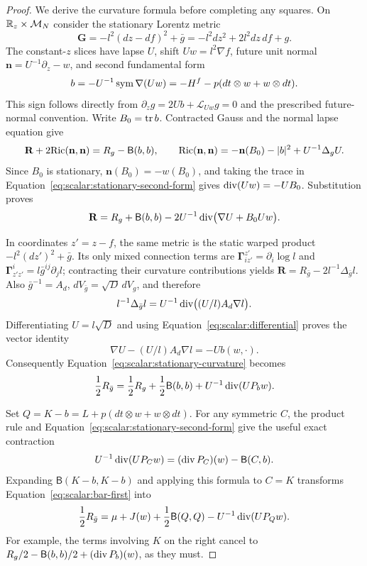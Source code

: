 \begin{proof}
We derive the curvature formula before completing any squares.  On
$\mathbb R_z\times\mathcal M_N$ consider the stationary Lorentz metric
\[
 \mathbf G=-l^2(dz-df)^2+\bar g
          =-l^2dz^2+2l^2dz\,df+g.
\]
The constant-$z$ slices have lapse $U$, shift $Uw=l^2\nabla f$,
future unit normal $\mathbf n=U^{-1}\partial_z-w$, and second
fundamental form
\begin{equation}
 b=-U^{-1}\operatorname{sym}\nabla(Uw)
   =-H^f-p(dt\otimes w+w\otimes dt).
 \label{eq:scalar:stationary-second-form}
\end{equation}
This sign follows directly from
$\partial_zg=2Ub+\mathcal L_{Uw}g=0$ and the prescribed future-normal
convention.  Write $B_0=\operatorname{tr} b$.  Contracted Gauss and the normal lapse
equation give
\[
 \mathbf R+2\mathbf{\operatorname{Ric}}(\mathbf n,\mathbf n)=R_g-\mathsf B(b,b),
 \qquad
 \mathbf{\operatorname{Ric}}(\mathbf n,\mathbf n)
   =-\mathbf n(B_0)-|b|^2+U^{-1}\Delta_gU.
\]
Since $B_0$ is stationary, $\mathbf n(B_0)=-w(B_0)$, and taking the
trace in Equation~\eqref{eq:scalar:stationary-second-form} gives
$\operatorname{div}(Uw)=-UB_0$.  Substitution proves
\begin{equation}
 \mathbf R=R_g+\mathsf B(b,b)
  -2U^{-1}\operatorname{div}\bigl(\nabla U+B_0Uw\bigr).
 \label{eq:scalar:stationary-curvature}
\end{equation}

In coordinates $z'=z-f$, the same metric is the static warped product
$-l^2(dz')^2+\bar g$.  Its only mixed connection terms are
$\boldsymbol\Gamma^{z'}_{iz'}=\partial_i\log l$ and
$\boldsymbol\Gamma^i_{z'z'}=l\bar g^{ij}\partial_jl$; contracting
their curvature contributions yields
$\mathbf R=R_{\bar g}-2l^{-1}\Delta_{\bar g}l$.
Also $\bar g^{-1}=A_d$, $dV_{\bar g}=\sqrt D\,dV_g$, and therefore
\[
 l^{-1}\Delta_{\bar g}l
   =U^{-1}\operatorname{div}\bigl((U/l)A_d\nabla l\bigr).
\]
Differentiating $U=l\sqrt D$ and using
Equation~\eqref{eq:scalar:differential} proves the vector identity
\[
 \nabla U-(U/l)A_d\nabla l=-Ub(w,\cdot).
\]
Consequently Equation~\eqref{eq:scalar:stationary-curvature} becomes
\begin{equation}
 \frac12R_{\bar g}
   =\frac12R_g+\frac12\mathsf B(b,b)
          +U^{-1}\operatorname{div}(UP_bw).
 \label{eq:scalar:bar-first}
\end{equation}

Set $Q=K-b=L+p(dt\otimes w+w\otimes dt)$.  For any symmetric $C$,
the product rule and Equation~\eqref{eq:scalar:stationary-second-form}
give the useful exact contraction
\[
 U^{-1}\operatorname{div}(UP_Cw)=(\operatorname{div} P_C)(w)-\mathsf B(C,b).
\]
Expanding $\mathsf B(K-b,K-b)$ and applying this formula to $C=K$
transforms Equation~\eqref{eq:scalar:bar-first} into
\begin{equation}
 \frac12R_{\bar g}=\mu+J(w)+\frac12\mathsf B(Q,Q)
                         -U^{-1}\operatorname{div}(UP_Qw).
 \label{eq:scalar:bar-identity}
\end{equation}
For example, the terms involving $K$ on the right cancel to
$R_g/2-\mathsf B(b,b)/2+(\operatorname{div} P_b)(w)$, as they must.


\end{proof}
